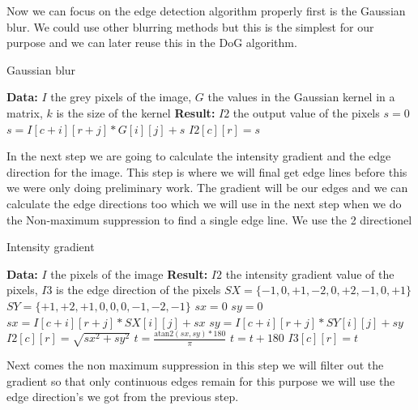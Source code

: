 Now we can focus on the edge detection algorithm properly first is the Gaussian blur. We could use other blurring methods but this is the simplest for our purpose and we can later reuse this in the \ac{DoG} algorithm.

\begin{algorithm}[H]
\caption{Gaussian blur}
\label{alg:gauss}
\begin{algorithmic}
\State \textbf{Data:} $I$ the grey pixels of the image, $G$ the values in the Gaussian kernel in a matrix, $k$ is the size of the kernel
\State \textbf{Result:} $I2$ the output value of the pixels
\State $s = 0$
\State $s = I[c + i ][r + j] * G[i][j] + s $
\EndFor
\EndFor
\State $I2[c][r] = s$
\EndFor
\end{algorithmic}
\end{algorithm}

In the next step we are going to calculate the intensity gradient and the edge direction for the image. This step is where we will final get edge lines before this we were only doing preliminary work. The gradient will be our edges and we can calculate the edge directions too which we will use in the next step when we do the Non-maximum suppression to find a single edge line. We use the 2 directionel 

\begin{algorithm}[H]
\caption{Intensity gradient}
\label{alg:sobel}
\begin{algorithmic}
\State \textbf{Data:} $I$ the pixels of the image
\State \textbf{Result:} $I2$ the intensity gradient value of the pixels, $I3$ is the edge direction of the pixels
\State $SX = \{-1, 0, +1, -2, 0, +2, -1, 0, +1\}$
\State $SY = \{+1, +2, +1, 0, 0, 0, -1, -2, -1\}$
\State $sx = 0$
\State $sy = 0$
\State $sx = I[c + i ][r + j] * SX[i][j] + sx $
\State $sy = I[c + i ][r + j] * SY[i][j] + sy $
\EndFor
\EndFor
\State $I2[c][r] = \sqrt{sx^2+sy^2}$
\State $t = \frac{\text{atan2}(sx,sy) * 180}{\pi} $
\State $t = t + 180$
\EndIf
\State $I3[c][r] = t$
\EndFor
\end{algorithmic}
\end{algorithm}

Next comes the non maximum suppression in this step we will filter out the gradient so that only continuous edges remain for this purpose we will use the edge direction's we got from the previous step.

